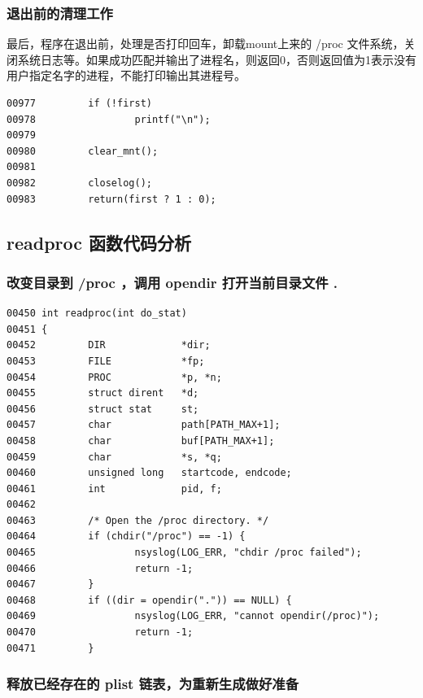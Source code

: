 \subsubsection{退出前的清理工作}

最后，程序在退出前，处理是否打印回车，卸载mount上来的 /proc
文件系统，关闭系统日志等。如果成功匹配并输出了进程名，则返回0，否则返回值为1表示没有用户指定名字的进程，不能打印输出其进程号。

{\begin{shaded}\begin{verbatim}
00977         if (!first)
00978                 printf("\n");
00979 
00980         clear_mnt();
00981 
00982         closelog();
00983         return(first ? 1 : 0);
\end{verbatim}\end{shaded}}
\subsection{readproc 函数代码分析}

\subsubsection{改变目录到 /proc ，调用 opendir 打开当前目录文件 .}

{\begin{shaded}\begin{verbatim}
00450 int readproc(int do_stat)
00451 {
00452         DIR             *dir;
00453         FILE            *fp;
00454         PROC            *p, *n;
00455         struct dirent   *d;
00456         struct stat     st;
00457         char            path[PATH_MAX+1];
00458         char            buf[PATH_MAX+1];
00459         char            *s, *q;
00460         unsigned long   startcode, endcode;
00461         int             pid, f;
00462 
00463         /* Open the /proc directory. */
00464         if (chdir("/proc") == -1) {
00465                 nsyslog(LOG_ERR, "chdir /proc failed");
00466                 return -1;
00467         }
00468         if ((dir = opendir(".")) == NULL) {
00469                 nsyslog(LOG_ERR, "cannot opendir(/proc)");
00470                 return -1;
00471         }
\end{verbatim}\end{shaded}}
\subsubsection{释放已经存在的 plist 链表，为重新生成做好准备}

